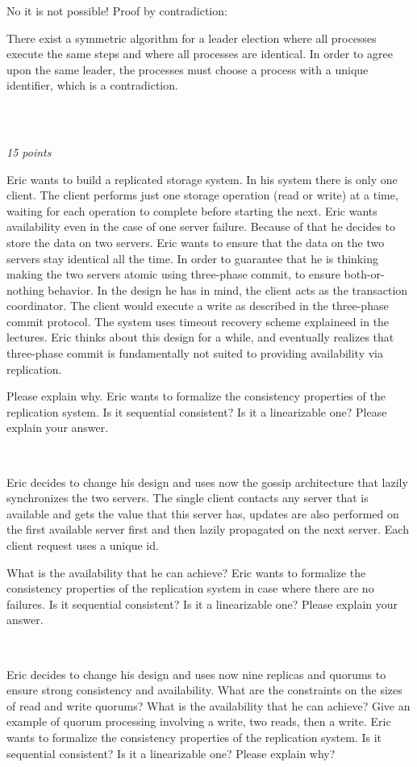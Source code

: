 \documentclass[a4paper]{article}
\newcommand{\points}[1]{\subsection{} \textit{#1 points}\\}
\newcommand{\question}[2][]{
  \parbox[t]{\textwidth}{
    \ifthenelse{\equal{#1}{}}{}{#1)}
    \parbox[t]{0.95\textwidth}{#2}}\\}
\newcommand{\solution}[2][]{
  \ifthenelse{\equal{#1}{} \or \equal{#1}{a}}{\\[3pt]\textit{Solution: }\\[0.1cm]}{}
  \parbox[t]{\textwidth}{
    \ifthenelse{\equal{#1}{}}{}{#1)}
    \parbox[t]{0.95\textwidth}{#2}}\\
}
\begin{document}
\solution[c]{
  No it is not possible! Proof by contradiction:

  There exist a symmetric algorithm for a leader election where all
  processes execute the same steps and where all processes are
  identical. In order to agree upon the same leader, the processes must
  choose a process with a unique identifier, which is a contradiction.
}
\points{15}
\question[a]{
  Eric wants to build a replicated storage system. In his
  system there is only one client. The client performs just one
  storage operation (read or write) at a time, waiting for each
  operation to complete before starting the next. Eric wants
  availability even in the case of one server failure. Because of that
  he decides to store the data on two servers. Eric wants to ensure
  that the data on the two servers stay identical all the time. In
  order to guarantee that he is thinking making the two servers atomic
  using three-phase commit, to ensure both-or-nothing behavior. In the
  design he has in mind, the client acts as the transaction
  coordinator. The client would execute a write as described in the
  three-phase commit protocol. The system uses timeout recovery scheme
  explaineed in the lectures. Eric thinks about this design for a
  while, and eventually realizes that three-phase commit is
  fundamentally not suited to providing availability via
  replication.

  Please explain why. Eric wants to formalize the consistency
  properties of the replication system. Is it sequential consistent?
  Is it a linearizable one? Please explain your answer.
}
\question[b]{
  Eric decides to change his design and uses now the gossip
  architecture that lazily synchronizes the two servers. The single
  client contacts any server that is available and gets the value that
  this server has, updates are also performed on the first available
  server first and then lazily propagated on the next server. Each
  client request uses a unique id.

  What is the availability that he can achieve? Eric wants to
  formalize the consistency properties of the replication system in
  case where there are no failures. Is it sequential consistent? Is it
  a linearizable one? Please explain your answer.
}
\question[c]{
  Eric decides to change his design and uses now nine replicas
  and quorums to ensure strong consistency and availability. What are
  the constraints on the sizes of read and write quorums? What is the
  availability that he can achieve? Give an example of quorum
  processing involving a write, two reads, then a write. Eric wants
  to formalize the consistency properties of the replication
  system. Is it sequential consistent? Is it a linearizable one?
  Please explain why?
}
\end{document}
